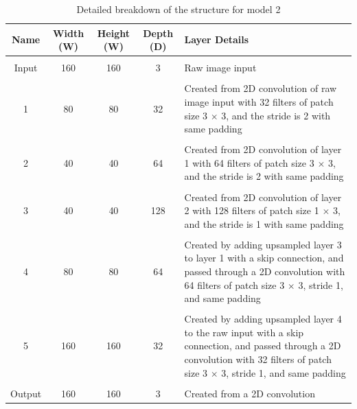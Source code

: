 \documentclass[a4paper]{article}
\begin{document}
\begin{table}[h]
\centering
\caption{Detailed breakdown of the structure for model 2}\scriptsize
\begin{tabular}{ccccp{8cm}}
\toprule
\textbf{Name} & \textbf{Width (W)} & \textbf{Height (W)} & \textbf{Depth (D)} & Layer Details\\  
\midrule
 & & & &\\
Input & 160 & 160 & 3 & Raw image input\\
 & & & &\\
1 & 80 & 80 & 32 & Created from 2D convolution of raw image input with 32 filters of patch size 3 $\times $ 3, and the stride is 2 with same padding\\
 & & & &\\
2 & 40 & 40 & 64 & Created from 2D convolution of layer 1 with 64 filters of patch size 3 $\times $ 3, and the stride is 2 with same padding\\
 & & & &\\
3 & 40 & 40 & 128 & Created from 2D convolution of layer 2 with 128 filters of patch size 1 $\times$ 3, and the stride is 1 with same padding\\
 & & & &\\
4 & 80 & 80 & 64 & Created by adding upsampled layer 3 to layer 1 with a skip connection, and passed through a 2D convolution with 64 filters of patch size 3 $\times$ 3, stride 1, and same padding\\
 & & & &\\
5 & 160 & 160 & 32 & Created by adding upsampled layer 4 to the raw input with a skip connection, and passed through a 2D convolution with 32 filters of patch size 3 $\times$ 3, stride 1, and same padding \\
 & & & &\\
Output & 160 & 160 & 3 & Created from a 2D convolution\\
\bottomrule
\end{tabular}
\end{table}

\newpage
\end{document}
